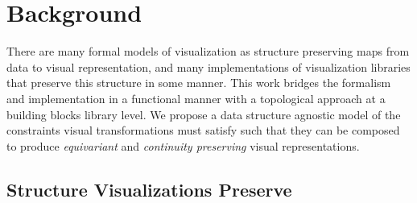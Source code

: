 \documentclass[../main.tex]{subfiles}
\begin{document}
\section{Background}
There are many formal models of visualization as structure preserving maps from data to visual representation, and many implementations of visualization libraries that preserve this structure in some manner. This work bridges the formalism and implementation in a functional manner with a topological approach at a building blocks library level. We propose a data structure agnostic model of the constraints visual transformations must satisfy such that they can be composed to produce \textit{equivariant} and \textit{continuity preserving} visual representations. 

\subsection{Structure Visualizations Preserve}
\label{sec:intro:structure}
\end{document}
